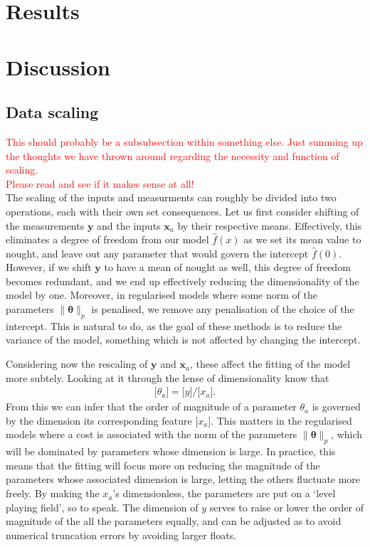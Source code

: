 \documentclass[twocolumn,english,notitlepage]{article}
\newcommand{\comment}[1]{\textcolor{red}{#1}\\}
\renewcommand{\vec}[1]{\boldsymbol{#1}}
\renewcommand{\norm}[2][]{\ensuremath{\|#2\|_{#1}}}
\newcommand{\dimof}[1]{\bigl[#1\bigr]}
\begin{document}
\section{Results}

\section{Discussion}
    \subsection{Data scaling}
        \comment{This should probably be a subsubsection within something else. Just summing up the thoughts we have thrown around regarding the necessity and function of scaling.}
        \comment{Please read and see if it makes sense at all!}
        The scaling of the inputs and measurments can roughly be divided into two operations, each with their own set consequences. Let us first consider shifting of the measurements $\vec{y}$ and the inputs $\vec{x}_a$ by their respective means. Effectively, this eliminates a degree of freedom from our model $\hat{f}(x)$ as we set its mean value to nought, and leave out any parameter that would govern the intercept $\hat{f}(0)$. However, if we shift $\vec{y}$ to have a mean of nought as well, this degree of freedom becomes redundant, and we end up effectively reducing the dimensionality of the model by one. Moreover, in regularised models where some norm of the parameters $\norm[p]{\vec{\theta}}$ is penalised, we remove any penalisation of the choice of the intercept. This is natural to do, as the goal of these methods is to reduce the variance of the model, something which is not affected by changing the intercept.

        Considering now the rescaling of $\vec{y}$ and $\vec{x}_a$, these affect the fitting of the model more subtely. Looking at it through the lense of dimensionality know that
        \begin{align}
            \dimof{\theta_a} = \dimof{y} / \dimof{x_a}.
        \end{align}
        From this we can infer that the order of magnitude of a parameter $\theta_a$ is governed by the dimension its corresponding feature $\dimof{x_a}$. This matters in the regularised models where a cost is associated with the norm of the parameters $\norm[p]{\vec{\theta}}$, which will be dominated by parameters whose dimension is large. In practice, this means that the fitting will focus more on reducing the magnitude of the parameters whose associated dimension is large, letting the others fluctuate more freely. By making the $x_a$'s dimensionless, the parameters are put on a `level playing field', so to speak. The dimension of $y$ serves to raise or lower the order of magnitude of the all the parameters equally, and can be adjusted as to avoid numerical truncation errors by avoiding larger floats.
\end{document}
